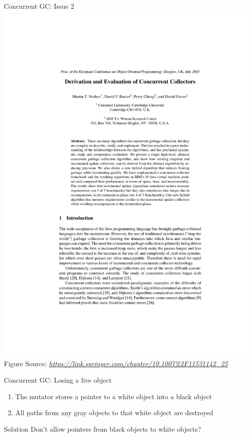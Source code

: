 \documentclass[
14pt,
aspectratio=169,
usenames,
dvipsnames,
x11names]{beamer}
\newcommand{\src}[1]{\scriptsize Figure Source: \textit{#1}}
\begin{document}
\begin{frame}{Concurrent GC: Issue 2}
  \centering
  \includegraphics[page=9,trim=4cm 19.5cm 4cm 6cm,clip,width=\linewidth]{Vechev05Derivation}\\
  \src{\url{https://link.springer.com/chapter/10.1007\%2F11531142_25}}
\end{frame}

\begin{frame}{Concurrent GC: Losing a live object}
  \begin{enumerate}
  \item The \alert{mutator} stores a pointer to a white object into a black object
  \item \alert{All paths} from \alert{any gray objects} to that white object are destroyed
  \end{enumerate}
  \vfill
  \pause
  \begin{alertblock}{Solution}
    Don't allow pointers from black objects to white objects?
  \end{alertblock}
\end{frame}
\end{document}
